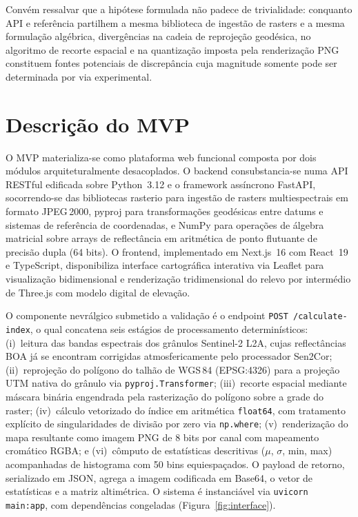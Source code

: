 \documentclass[10pt, a4paper]{article}
\begin{document}
Convém ressalvar que a hipótese formulada não padece de trivialidade: conquanto API e referência partilhem a mesma biblioteca de ingestão de rasters e a mesma formulação algébrica, divergências na cadeia de reprojeção geodésica, no algoritmo de recorte espacial e na quantização imposta pela renderização PNG constituem fontes potenciais de discrepância cuja magnitude somente pode ser determinada por via experimental.

\section{Descrição do MVP}

O MVP materializa-se como plataforma web funcional composta por dois módulos arquiteturalmente desacoplados. O backend consubstancia-se numa API RESTful edificada sobre Python~3.12 e o framework assíncrono FastAPI, socorrendo-se das bibliotecas rasterio para ingestão de rasters multiespectrais em formato JPEG\,2000, pyproj para transformações geodésicas entre datums e sistemas de referência de coordenadas, e NumPy para operações de álgebra matricial sobre arrays de reflectância em aritmética de ponto flutuante de precisão dupla (64 bits). O frontend, implementado em Next.js~16 com React~19 e TypeScript, disponibiliza interface cartográfica interativa via Leaflet para visualização bidimensional e renderização tridimensional do relevo por intermédio de Three.js com modelo digital de elevação.

O componente nevrálgico submetido a validação é o endpoint \texttt{POST /calculate-index}, o qual concatena seis estágios de processamento determinísticos: (i)~leitura das bandas espectrais dos grânulos Sentinel-2 L2A, cujas reflectâncias BOA já se encontram corrigidas atmosfericamente pelo processador Sen2Cor; (ii)~reprojeção do polígono do talhão de WGS\,84 (EPSG:4326) para a projeção UTM nativa do grânulo via \texttt{pyproj.Transformer}; (iii)~recorte espacial mediante máscara binária engendrada pela rasterização do polígono sobre a grade do raster; (iv)~cálculo vetorizado do índice em aritmética \texttt{float64}, com tratamento explícito de singularidades de divisão por zero via \texttt{np.where}; (v)~renderização do mapa resultante como imagem PNG de 8 bits por canal com mapeamento cromático RGBA; e (vi)~cômputo de estatísticas descritivas ($\mu$, $\sigma$, min, max) acompanhadas de histograma com 50 bins equiespaçados. O payload de retorno, serializado em JSON, agrega a imagem codificada em Base64, o vetor de estatísticas e a matriz altimétrica. O sistema é instanciável via \texttt{uvicorn main:app}, com dependências congeladas (Figura~\ref{fig:interface}).
\end{document}
